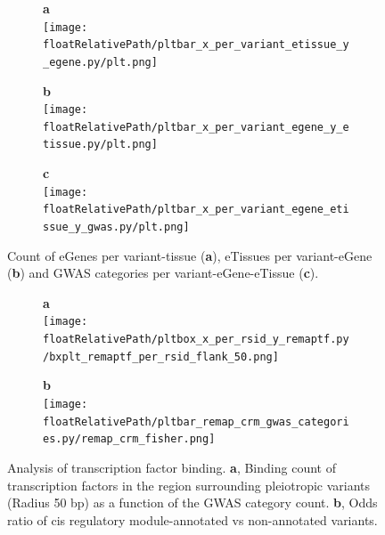 %
%

\begin{figure}[!tbp]
\centering
%
\begin{subfigure}[]{.32\textwidth}
\textbf{a}
\\
\texttt{[image: \\floatRelativePath/pltbar\_x\_per\_variant\_etissue\_y\_egene.py/plt.png]}
\end{subfigure}
%
\begin{subfigure}[]{.32\textwidth}
\textbf{b}
\\
\texttt{[image: \\floatRelativePath/pltbar\_x\_per\_variant\_egene\_y\_etissue.py/plt.png]}
\end{subfigure}
%
\begin{subfigure}[]{.32\textwidth}
\textbf{c}
\\
\texttt{[image: \\floatRelativePath/pltbar\_x\_per\_variant\_egene\_etissue\_y\_gwas.py/plt.png]}
\end{subfigure}
%
\caption{Count of eGenes per variant-tissue (\textbf{a}), eTissues per variant-eGene (\textbf{b}) and GWAS categories per variant-eGene-eTissue (\textbf{c}).} \label{fig:gwas_egene_etisue_per_variant}
%
\end{figure}

%
%

\begin{figure}[!tbp]
\centering
%
\begin{subfigure}[]{.33\textwidth}
\textbf{a}
\\
\texttt{[image: \\floatRelativePath/pltbox\_x\_per\_rsid\_y\_remaptf.py/bxplt\_remaptf\_per\_rsid\_flank\_50.png]}
\end{subfigure}
%
\begin{subfigure}[]{.33\textwidth}
\textbf{b}
\\
\texttt{[image: \\floatRelativePath/pltbar\_remap\_crm\_gwas\_categories.py/remap\_crm\_fisher.png]}
\end{subfigure}
%
\caption{Analysis of transcription factor binding. \textbf{a}, Binding count of transcription factors in the region surrounding pleiotropic variants (Radius 50 bp) as a function of the GWAS category count. \textbf{b}, Odds ratio of cis regulatory module-annotated vs non-annotated variants.} \label{fig:freq_tf_per_variant}
%
\end{figure}


